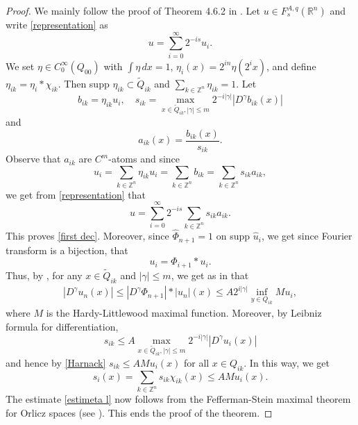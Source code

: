 \documentclass[leqno,twoside, 12pt]{amsart}
\theoremstyle{plain}
\numberwithin{equation}{section} \numberwithin{figure}{section}
\theoremstyle{definition}
\newcommand{\R}{\mathbb R}
\numberwithin{equation}{section}
\begin{document}
\begin{proof}We mainly follow the proof of Theorem 4.6.2 in \cite{AH}. Let $u\in F_s^{A, q}(\R^n)$ and write \eqref{representation} as 
$$u=\sum_{i=0}^\infty 2^{-is}u_i.$$We set $\eta\in C_0^{\infty}(Q_{00})$ with $\int\eta\,dx=1$, $\eta_i(x)=2^{in}\eta(2^ix)$, and define $\eta_{ik}=\eta_i*\chi_{ik}$. Then supp $\eta_{ik}\subset \tilde{Q}_{ik}$ and $\sum_{k\in \mathbb{Z}^n}\eta_{ik}=1$. Let
$$b_{ik}=\eta_{ik}u_i, \quad s_{ik}=\max_{x\in \tilde{Q}_{ik}, |\gamma|\leq m}2^{-i|\gamma|}|D^\gamma b_{ik}(x)|$$and
$$a_{ik}(x)=\dfrac{b_{ik}(x)}{s_{ik}}.$$Observe that $a_{ik}$ are $C^m$-atoms and since
$$u_i=\sum_{k\in \mathbb{Z}^n}\eta_{ik}u_i=\sum_{k\in \mathbb{Z}^n}b_{ik}= \sum_{k\in \mathbb{Z}^n}s_{ik}a_{ik},$$we get from \eqref{representation} that
$$u=\sum_{i=0}^\infty 2^{-is}\sum_{k\in \mathbb{Z}^n}s_{ik}a_{ik}.$$This proves \eqref{first dec}. Moreover, since $\hat \Phi_{n+1}=1$ on supp $\hat u_i$, we get since Fourier transform is a bijection, that
$$u_i=\Phi_{i+1}*u_i.$$Thus, by \cite[Lemma 4.3.7]{AH}, for any $x\in \tilde{Q}_{ik}$ and $|\gamma|\leq m$, we get as in \cite[Theorem 4.6.2]{AH} that
\begin{equation}\label{Harnack}
\begin{split}
|D^\gamma u_n(x)|\leq |D^\gamma \Phi_{n+1}|*|u_n|(x) \leq A2^{i|\gamma|}\inf_{y\in Q_{ik}}Mu_i,
\end{split}
\end{equation}where $M$ is the Hardy-Littlewood maximal function. Moreover, by Leibniz formula for differentiation,
$$s_{ik}\leq A\max_{x\in \tilde{Q}_{ik}, |\gamma|\leq m}2^{-i|\gamma|}|D^\gamma u_i(x)|$$and hence by \eqref{Harnack} $s_{ik}\leq AMu_i(x)$ for all $x\in Q_{ik}$. In this way, we get
$$s_i(x)=\sum_{k\in \mathbb{Z}^n}s_{ik}\chi_{ik}(x)\leq AMu_i(x).$$The estimate \eqref{estimeta l} now follows from the Fefferman-Stein maximal theorem for Orlicz spaces (see \cite[Corollary 5.4.1]{HH}). This ends the proof of the theorem. 
\end{proof}
\end{document}
